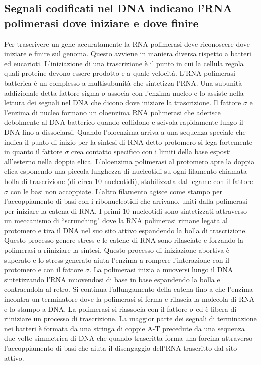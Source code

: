 \subsection{Segnali codificati nel DNA indicano l'RNA polimerasi dove iniziare e dove finire}
Per trascrivere un gene accuratamente la RNA polimerasi deve riconoscere dove iniziare e finire sul genoma. Questo avviene in maniera diversa rispetto a batteri ed eucarioti. 
L'iniziazione di una trascrizione \`e il punto in cui la cellula regola quali proteine devono essere prodotto e a quale velocit\`a. L'RNA polimerasi batterica \`e un complesso a 
multisubunit\`a che sintetizza l'RNA. Una subunit\`a addizionale detta fattore sigma $\sigma$ associa con l'enzima nucleo e lo assiste nella lettura dei segnali nel DNA che dicono dove
iniziare la trascrizione. Il fattore $\sigma$ e l'enzima di nucleo formano un oloenzima RNA polimerasi che aderisce debolmente al DNA batterico quando collidono e scivola rapidamente 
lungo il DNA fino a dissociarsi. Quando l'oloenzima arriva a una sequenza speciale che indica il punto di inizio per la sintesi di RNA detto protomero si lega fortemente in quanto il 
fattore $\sigma$  crea contatto specifico con i limiti della base esposti all'esterno nella doppia elica. L'oloenzima polimerasi al protomero apre la doppia elica esponendo una piccola
lunghezza di nucleotidi su ogni filamento chiamata bolla di trascrizione (di circa $10$ nucleotidi), stabilizzata dal legame con il fattore $\sigma$ con le basi non accoppiate. L'altro
filamento agisce come stampo per l'accoppiamento di basi con i ribonucleotidi che arrivano, uniti dalla polimerasi per iniziare la catena di RNA. I primi $10$ nucleotidi sono 
sintetizzati attraverso un meccanismo di ``scrunching" dove la RNA polimerasi rimane legata al protomero e tira il DNA nel suo sito attivo espandendo la bolla di trascrizione. Questo
processo genere stress e le catene di RNA sono rilasciate e forzando la polimerasi a riiniziare la sintesi. Questo processo di iniziazione abortiva \`e superato e lo stress generato 
aiuta l'enzima a rompere l'interazione con il protomero e con il fattore $\sigma$. La polimerasi inizia a muoversi lungo il DNA sintetizzando l'RNA muovendosi di base in base espandendo
la bolla e contraendola al retro. Si continua l'allungamento della catena fino a che l'enzima incontra un terminatore dove la polimerasi si ferma e rilascia la molecola di RNA e lo 
stampo a DNA. La polimerasi si riassocia con il fattore $\sigma$ ed \`e libera di riiniziare un processo di trascrizione. La maggior parte dei segnali di terminazione nei batteri \`e
formata da una stringa di coppie A-T precedute da una sequenza due volte simmetrica  di DNA che quando trascritta forma una forcina attraverso l'accoppiamento di basi che aiuta il 
disengaggio dell'RNA trascritto dal sito attivo.
